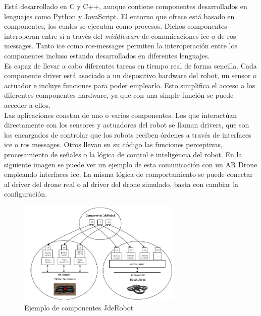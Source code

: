 Está desarrollado en C y C++, aunque contiene componentes desarrollados en lenguajes como Python y JavaScript. El entorno que ofrece está basado en componentes, los cuales se ejecutan como procesos. Dichos componentes interoperan entre sí a través del \textit{middleware} de comunicaciones \acrshort{ice} o de \acrshort{ros} messages. Tanto \acrshort{ice} como \acrshort{ros}-messages permiten la interoperación entre los componentes incluso estando desarrollados en diferentes lenguajes.\\

Es capaz de llevar a cabo diferentes tareas en tiempo real de forma sencilla. Cada componente driver está asociado a un dispositivo hardware del robot, un sensor o actuador e incluye funciones para poder emplearlo. Esto simplifica el acceso a los diferentes componentes hardware, ya que con una simple función se puede acceder a ellos.\\

Las aplicaciones constan de uno o varios componentes. Los que interactúan directamente con los sensores y actuadores del robot se llaman drivers, que son los encargados de controlar que los robots reciben órdenes a través de interfaces \acrshort{ice} o \acrshort{ros} messages. Otros llevan en su código las funciones perceptivas, procesamiento de señales o la lógica de control e inteligencia del robot. En la siguiente imagen se puede ver un ejemplo de esta comunicación con un AR Drone empleando interfaces \acrshort{ice}. La misma lógica de comportamiento se puede conectar al driver del drone real o al driver del drone simulado, basta con cambiar la configuración.

\begin{figure}[H]
  \begin{center}
    \includegraphics[width=0.7\textwidth]{figures/Infraestructura/jderobot.png}
		\caption{Ejemplo de componentes JdeRobot }
		\label{fig.jderobot}
		\end{center}
\end{figure}

